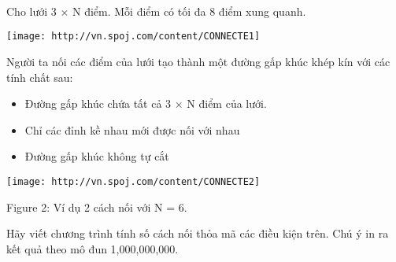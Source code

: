  

 

 

Cho lưới 3 × N điểm. Mỗi điểm có tối đa 8 điểm xung quanh.


\texttt{[image: http://vn.spoj.com/content/CONNECTE1]}

Người ta nối các điểm của lưới tạo thành một đường gấp khúc khép kín với các tính chất sau:
\begin{itemize}
	\item Đường gấp khúc chứa tất cả 3 × N điểm của lưới.
	\item Chỉ các đỉnh kề nhau mới được nối với nhau
	\item Đường gấp khúc không tự cắt
\end{itemize}


\texttt{[image: http://vn.spoj.com/content/CONNECTE2]}

Figure 2: Ví dụ 2 cách nối với N = 6.

Hãy viết chương trình tính số cách nối thỏa mã các điều kiện trên. Chú ý in ra kết quả theo mô đun 1,000,000,000.